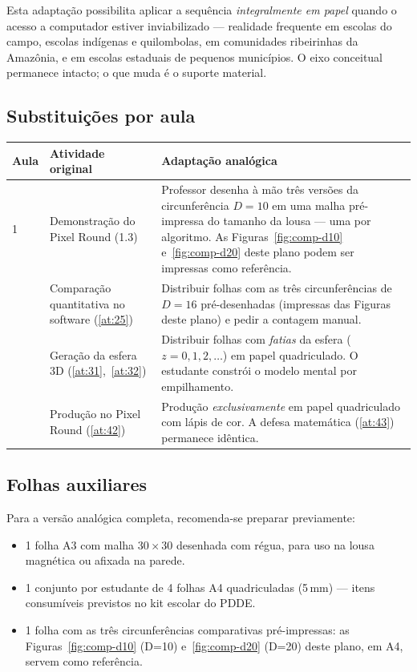 \documentclass[12pt,a4paper]{scrartcl}
\begin{document}
Esta adaptação possibilita aplicar a sequência \emph{integralmente em papel} quando o acesso a computador estiver inviabilizado --- realidade frequente em escolas do campo, escolas indígenas e quilombolas, em comunidades ribeirinhas da Amazônia, e em escolas estaduais de pequenos municípios. O eixo conceitual permanece intacto; o que muda é o suporte material.

\subsection{Substituições por aula}

\begin{center}
\small
\begin{tabularx}{\textwidth}{@{}p{}p{}X@{}}
\toprule
\textbf{Aula} & \textbf{Atividade original} & \textbf{Adaptação analógica} \\
\midrule
1 & Demonstração do Pixel Round (1.3) & Professor desenha à mão três versões da circunferência $D = 10$ em uma malha pré-impressa do tamanho da lousa --- uma por algoritmo. As Figuras~\ref{fig:comp-d10} e~\ref{fig:comp-d20} deste plano podem ser impressas como referência. \\
\addlinespace[3pt]
2 & Comparação quantitativa no software (\ref{at:25}) & Distribuir folhas com as três circunferências de $D = 16$ pré-desenhadas (impressas das Figuras deste plano) e pedir a contagem manual. \\
\addlinespace[3pt]
3 & Geração da esfera 3D (\ref{at:31},~\ref{at:32}) & Distribuir folhas com \emph{fatias} da esfera ($z = 0, 1, 2, \ldots$) em papel quadriculado. O estudante constrói o modelo mental por empilhamento. \\
\addlinespace[3pt]
4 & Produção no Pixel Round (\ref{at:42}) & Produção \emph{exclusivamente} em papel quadriculado com lápis de cor. A defesa matemática (\ref{at:43}) permanece idêntica. \\
\bottomrule
\end{tabularx}
\end{center}

\subsection{Folhas auxiliares}
Para a versão analógica completa, recomenda-se preparar previamente:
\begin{itemize}[leftmargin=1.3em,itemsep=0.1em,topsep=0.2em,nosep]
  \item 1 folha A3 com malha $30 \times 30$ desenhada com régua, para uso na lousa magnética ou afixada na parede.
  \item 1 conjunto por estudante de 4 folhas A4 quadriculadas (5\,mm) --- itens consumíveis previstos no kit escolar do PDDE.
  \item 1 folha com as três circunferências comparativas pré-impressas: as Figuras~\ref{fig:comp-d10} (D=10) e~\ref{fig:comp-d20} (D=20) deste plano, em A4, servem como referência.
\end{itemize}
\end{document}
